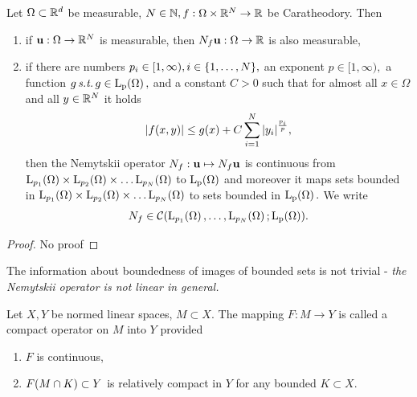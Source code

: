 \documentclass{article}
\begin{document}
\begin{theorem}
  Let $\Omega \subset {\mathbb R}^{d}$ be measurable, $N \in {\mathbb N}, f: \Omega \times {\mathbb R}^{N} \to {\mathbb R}$ be Caratheodory. Then

  \begin{enumerate}
	  \item if $\vb{u}: \Omega \to {\mathbb R}^{N}$ is measurable, then $N_f \vb{u}: \Omega \to {\mathbb R}$ is also measurable,
	  \item if there are numbers $p_i \in [1, \infty), i \in \qty{1, \dots, N},$ an exponent $p \in [1, \infty),$ a function $g \, \text{\textit{s.t.}} \, g \in \LpSet{\Omega},$ and a constant $C>0$ such that for almost all $x \in \Omega$ and all $y \in {\mathbb R}^{N}$ it holds
		  \[
			  \abs{f(x,y)}\leq g(x) + C \sum_{i=1}^N\abs{y_i}^{\frac{p_i}{p}},
		  \]
		  then the Nemytskii operator $N_f: \vb{u} \mapsto N_f\vb{u}$ is continuous from $\LpSet[p_1]{\Omega} \times \LpSet[p_2]{\Omega} \times \dots \LpSet[p_N]{\Omega}$ to $\LpSet{\Omega}$ and moreover it maps sets bounded in $\LpSet[p_1]{\Omega} \times \LpSet[p_2]{\Omega} \times \dots \LpSet[p_N]{\Omega}$ to sets bounded in $\LpSet{\Omega}.$ We write
		  \[
			  N_f \in \mathcal{C}\qty(\LpSet[p_1]{\Omega}, \dots, \LpSet[p_N]{\Omega}; \LpSet{\Omega}).
		  \]
  \end{enumerate}
\end{theorem}

\begin{proof}
	No proof
\end{proof}

\begin{remark}
	The information about boundedness of images of bounded sets is not trivial - \textit{the Nemytskii operator is not linear in general.}
\end{remark}

\begin{definition}
	Let $X,Y$ be normed linear spaces, $M \subset X.$ The mapping $F:M \to Y$ is called a compact operator on $M$ into $Y$ provided
	\begin{enumerate}
		\item $F$ is continuous,
		\item $F\qty(M \cap K) \subset Y$ is relatively compact in $Y$ for any bounded $K \subset X.$
	\end{enumerate}
\end{definition}
\end{document}
